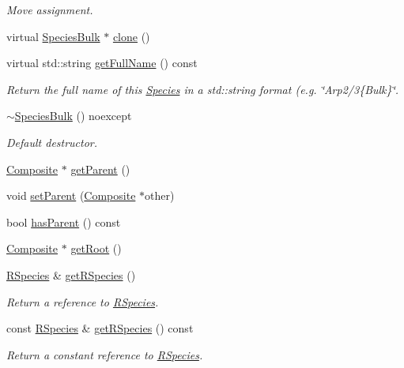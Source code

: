 \begin{DoxyCompactItemize}
\begin{DoxyCompactList}\small\item\em Move assignment. \end{DoxyCompactList}\item 
virtual \hyperlink{classchem_1_1SpeciesBulk}{Species\-Bulk} $\ast$ \hyperlink{classchem_1_1SpeciesBulk_a7bfdd13273d7328c2f7d275796e57873}{clone} ()
\item 
virtual std\-::string \hyperlink{classchem_1_1SpeciesBulk_a340d3f16e075352bf1cbab7918f5ca20}{get\-Full\-Name} () const 
\begin{DoxyCompactList}\small\item\em Return the full name of this \hyperlink{classchem_1_1Species}{Species} in a std\-::string format (e.\-g. \char`\"{}\-Arp2/3\{\-Bulk\}\char`\"{}. \end{DoxyCompactList}\item 
\hyperlink{classchem_1_1SpeciesBulk_ae9f7976efc0117e213b1a616e1216d5d}{$\sim$\-Species\-Bulk} () noexcept
\begin{DoxyCompactList}\small\item\em Default destructor. \end{DoxyCompactList}\item 
\hyperlink{classchem_1_1Composite}{Composite} $\ast$ \hyperlink{classchem_1_1Species_acdc83314b339310022d56e024f124a34}{get\-Parent} ()
\item 
void \hyperlink{classchem_1_1Species_a50e1e828d0b8a03efc9354e2c00174f5}{set\-Parent} (\hyperlink{classchem_1_1Composite}{Composite} $\ast$other)
\item 
bool \hyperlink{classchem_1_1Species_a6ddddc5be2b0e4427486f80a891879b3}{has\-Parent} () const 
\item 
\hyperlink{classchem_1_1Composite}{Composite} $\ast$ \hyperlink{classchem_1_1Species_aa5931e2aae4856c1b438691c23ada5aa}{get\-Root} ()
\item 
\hyperlink{classchem_1_1RSpecies}{R\-Species} \& \hyperlink{classchem_1_1Species_a1719a8155a69e9a62593d23d4bfc8514}{get\-R\-Species} ()
\begin{DoxyCompactList}\small\item\em Return a reference to \hyperlink{classchem_1_1RSpecies}{R\-Species}. \end{DoxyCompactList}\item 
const \hyperlink{classchem_1_1RSpecies}{R\-Species} \& \hyperlink{classchem_1_1Species_a438dae186317809effdd040ed38c568b}{get\-R\-Species} () const 
\begin{DoxyCompactList}\small\item\em Return a constant reference to \hyperlink{classchem_1_1RSpecies}{R\-Species}. \end{DoxyCompactList}\item 

\end{DoxyCompactItemize}
